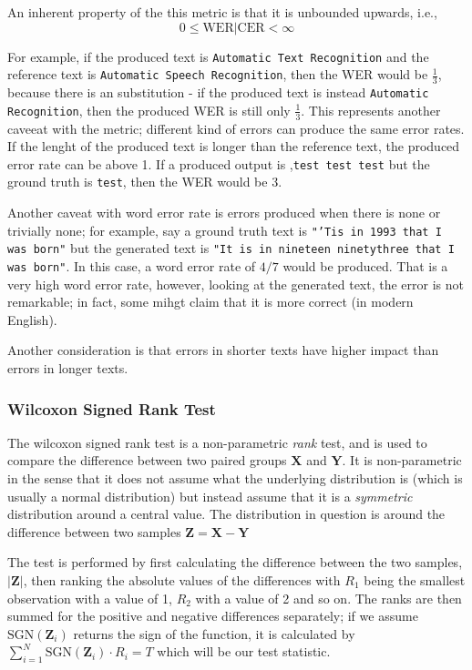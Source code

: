 An inherent property of the this metric is that it is unbounded upwards, i.e., $$0 \leq \textrm{WER|CER} < \infty$$

For example, if the produced text is \texttt{Automatic Text Recognition} and the reference text is \texttt{Automatic Speech Recognition}, then the WER would be $\frac{1}{3}$, because there is an substitution - if the produced text is instead \texttt{Automatic Recognition}, then the produced WER is still only $\frac{1}{3}$. This represents another caveeat with the metric; different kind of errors can produce the same error rates. If the lenght of the produced text is longer than the reference text, the produced error rate can be above 1. If a produced output is ,\texttt{test test test} but the ground truth is \texttt{test}, then the WER would be $3$.

Another caveat with word error rate is errors produced when there is none or trivially none; for example, say a ground truth text is \texttt{"'Tis in 1993 that I was born"} but the generated text is \texttt{"It is in nineteen ninetythree that I was born"}. In this case, a word error rate of $4/7$ would be produced. That is a very high word error rate, however, looking at the generated text, the error is not remarkable; in fact, some mihgt claim that it is more correct (in modern English).

Another consideration is that errors in shorter texts have higher impact than errors in longer texts.

\subsubsection{Wilcoxon Signed Rank Test}
The wilcoxon signed rank test is a non-parametric \textit{rank} test, and is used to compare the difference between two paired groups $\pmb{X}$ and $\pmb{Y}$. It is non-parametric in the sense that it does not assume what the underlying distribution is (which is usually a normal distribution) but instead assume that it is a \textit{symmetric} distribution around a central value. The distribution in question is around the difference between two samples $\pmb{Z} = \pmb{X} - \pmb{Y}$

The test is performed by first calculating the difference between the two samples, $|\pmb{Z}|$, then ranking the absolute values of the differences with $R_1$ being the smallest observation with a value of 1, $R_2$ with a value of 2 and so on. The ranks are then summed for the positive and negative differences separately; if we assume $\textrm{SGN}(\pmb{Z}_i)$ returns the sign of the function, it is calculated by $\sum_{i=1}^N\textrm{SGN}(\pmb{Z}_i)\cdot R_i = T$ which will be our test statistic.